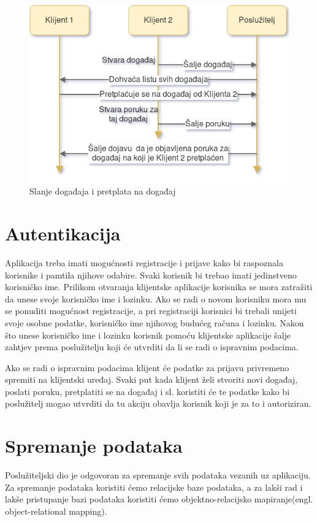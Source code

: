 \documentclass[times, utf8, zavrsni]{fer}
\begin{document}
{\begin{figure}[htb]
\centering
\includegraphics[width=\linewidth]{img/event-subscription.png}
\caption{Slanje događaja i pretplata na događaj}
\label{fig:event-subscription-image}
\end{figure}

\section{Autentikacija}
Aplikacija treba imati mogućnosti registracije i prijave kako bi raspoznala korisnike i pamtila njihove odabire. Svaki korisnik bi trebao imati jedinstveno korisničko ime. Prilikom otvaranja klijentske aplikacije korisnika se mora zatražiti da unese svoje korisničko ime i lozinku. Ako se radi o novom korisniku mora mu se ponuditi mogućnost registracije, a pri registraciji korisnici bi trebali unijeti svoje osobne podatke, korisničko ime njihovog budućeg računa i lozinku. Nakon što unese korisničko ime i lozinku korisnik pomoću klijentske aplikacije šalje zahtjev prema poslužitelju koji će utvrditi da li se radi o ispravnim podacima. 

Ako se radi o ispravnim podacima klijent će podatke za prijavu privremeno spremiti na klijentski uređaj. Svaki put kada klijent želi stvoriti novi događaj, poslati poruku, pretplatiti se na događaj i sl. koristiti će te podatke kako bi poslužitelj mogao utvrditi da tu akciju obavlja korisnik koji je za to i autoriziran.

\section{Spremanje podataka}
Poslužiteljski dio je odgovoran za spremanje svih podataka vezanih uz aplikaciju. Za spremanje podataka koristiti ćemo relacijske baze podataka, a za lakši rad i lakše pristupanje bazi podataka koristiti ćemo objektno-relacijsko mapiranje(engl. object-relational mapping).

}
\end{document}
